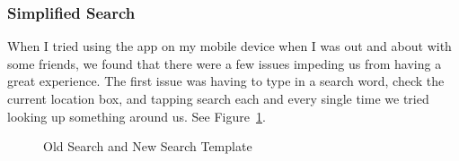 \documentclass[11pt]{article}
\begin{document}
\subsubsection{Simplified Search}
When I tried using the app on my mobile device when I was out and about with some friends, we found that there were a few issues impeding us from having a great experience. The first issue was having to type in a search word, check the current location box, and tapping search each and every single time we tried looking up something around us. See Figure~\ref{fig:SearchSimple}.

\begin{figure}[H]
    \centering
    \qquad
    \caption{Old Search and New Search Template}
    \label{fig:SearchSimple}          

\end{figure}
\end{document}
